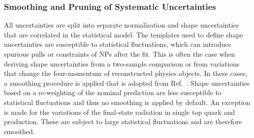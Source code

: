 


%


\subsubsection{Smoothing and Pruning of Systematic Uncertainties}

All uncertainties are split into separate normalisation and shape uncertainties
that are correlated in the statistical model. The templates used to define shape
uncertainties are susceptible to statistical fluctuations, which can introduce
spurious pulls or constraints of NPs after the fit. This is often the case when
deriving shape uncertainties from a two-sample comparison or from variations
that change the four-momentum of reconstructed physics objects. In these cases,
a smoothing procedure is applied that is adopted from
Ref.~\cite{HIGG-2013-23}. Shape uncertainties based on a re-weighting of the
nominal prediction are less susceptible to statistical fluctuations and thus no
smoothing is applied by default. An exception is made for the variations of the
final-state radiation in single top quark and \ttbar production. These are
subject to large statistical fluctuations and are therefore smoothed.

